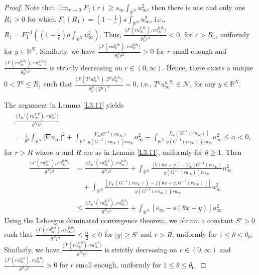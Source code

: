 \documentclass[10pt,a4paper]{amsart}
\numberwithin{equation}{section}
\begin{document}
\begin{proof}
Note that $\lim_{r\to0}F_1(r)\geq s_\infty\int_{\mathbb{R}^{N}}u_{\infty}^{2}$, 
then there is one and only one  $R_1>0$  for which 
$F_1(R_1)=(1-\frac{1}{c})a\int_{\mathbb{R}^N}u_\infty^2$, i.e., 
$R_1=F_1^{-1}((1-\frac{1}{c})a\int_{\mathbb{R}^N}u_\infty^2)$. 
Thus, $\frac{\langle J'(ru_{\infty}^{y,\theta_0}),ru_{\infty}^{y,\theta_0}\rangle}{\theta^N_0r^{2}}<0$, 
for $r>R_1$, uniformly for $y\in{\mathbb{R}^N}$. Similarly, we have $\frac{\langle J'(ru_{\infty}^{y,\theta_0}),ru_{\infty}^{y,\theta_0}\rangle}{\theta^N_0r^{2}}>0$ for $r$ small enough and
$\frac{\langle J'(ru_{\infty}^{y,\theta_0}),ru_{\infty}^{y,\theta_0}\rangle}{\theta^N_0r^{2}}$ 
is strictly decreasing on $r\in(0,\infty)$. Hence, there exists a unique $0<T^y\leq R_1$ 
such that $\frac{\langle J'(T^yu_{\infty}^{y,\theta_0}),T^yu_{\infty}^{y,\theta_0}\rangle}{\theta^N_0(T^y)^{2}}=0$, i.e., 
$T^y u_{\infty}^{y,\theta_0}\in\mathcal{N}$, for any $y\in{\mathbb{R}^N}$.

The argument in Lemma \ref{L3.11} yields 
\begin{align*}
&\frac{\langle J_\infty'(ru_{\infty}^{y,\theta}),ru_{\infty}^{y,\theta}\rangle}{\theta^Nr^{2}} \\
&=\frac{1}{\theta^2}\int_{\mathbb{R}^{N}} \vert \nabla u_{\infty} \vert^{2} + \int_{\mathbb{R}^{N}} \frac{V_\infty G^{-1}(ru_{\infty})}{g(G^{-1}(ru_{\infty}))ru_{\infty}} u_{\infty}^{2} 
  - \int_{\mathbb{R}^{N}}  \frac{f_\infty (G^{-1}(ru_{\infty}))}{g(G^{-1}(ru_{\infty}))ru_{\infty}} u_{\infty}^{2}\leq\alpha<0,
\end{align*} 
for $r>R$ where $\alpha$ and $R$ are as in Lemma \ref{L3.11}, uniformly for $\theta\geq1$. 
Then 
\begin{align*}
\frac{\langle J'(ru_{\infty}^{y,\theta}),ru_{\infty}^{y,\theta}\rangle}{\theta^Nr^{2}} 
&=\frac{\langle J_\infty'(ru_{\infty}^{y,\theta}),ru_{\infty}^{y,\theta}\rangle}{\theta^Nr^{2}}
 + \int_{\mathbb{R}^{N}} \frac{[V(\theta x+y)-V_\infty] G^{-1}(ru_{\infty})}{g(G^{-1}(ru_{\infty}))ru_{\infty}} u_{\infty}^{2} \\
&\quad + \int_{\mathbb{R}^{N}}  \frac{[f_\infty( G^{-1}(ru_{\infty}))-f(\theta x+y,G^{-1}(ru_{\infty}))]}{g(G^{-1}(ru_{\infty}))ru_{\infty}} u_{\infty}^{2}\\
&\leq\frac{\langle J_\infty'(ru_{\infty}^{y,\theta}),ru_{\infty}^{y,\theta}\rangle}{\theta^Nr^{2}}+\int_{\mathbb{R}^{N}}[s_\infty-s(\theta x+y)]u_{\infty}^{2}.
\end{align*} 
Using the Lebesgue dominated convergence theorem, we obtain a constant  $S'>0$ such that 
$\frac{\langle J'(ru_{\infty}^{y,\theta}),ru_{\infty}^{y,\theta}\rangle}{\theta^Nr^{2}} \leq\frac{\alpha}{2}<0$ 
for  $|y|\geq S'$ and $r>R$,  uniformly for $1\leq\theta\leq\theta_0$. 
Similarly, we have $\frac{\langle J'(ru_{\infty}^{y,\theta}),ru_{\infty}^{y,\theta}\rangle}{\theta^Nr^{2}}$ 
is strictly decreasing on $r\in(0,\infty)$ and 
$\frac{\langle J'(ru_{\infty}^{y,\theta}),ru_{\infty}^{y,\theta}\rangle}{\theta^Nr^{2}}>0$ for $r$ 
small enough, uniformly for $1\leq\theta\leq\theta_0$. 


\end{proof}
\end{document}

